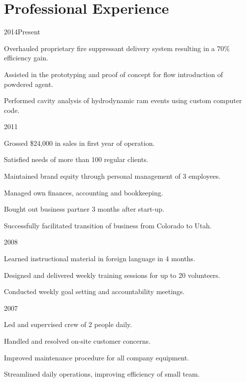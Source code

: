 \documentclass[letterpaper,10pt]{resume}
\begin{document}
	\section{Professional Experience}
	{2014\textendash Present}
	\begin{compactitem}
		\item Overhauled proprietary fire suppressant delivery system resulting in a 70\% efficiency gain.
		\item Assisted in the prototyping and proof of concept for flow introduction of powdered agent. 
		\item Performed cavity analysis of hydrodynamic ram events using custom computer code.
	\end{compactitem}
	
	{2011}
	\begin{compactitem}
		\item Grossed \$24,000 in sales in first year of operation.
		\item Satisfied needs of  more than 100 regular clients.
		\item Maintained brand equity through personal management of 3 employees.
		\item Managed own finances, accounting and bookkeeping.
		\item Bought out business partner 3 months after start-up.
		\item Successfully facilitated transition of business from Colorado to Utah.
	\end{compactitem}
	
	{2008}
	\begin{compactitem}
		\item Learned instructional material in foreign language in 4 months.
		\item Designed and delivered weekly training sessions for up to 20 volunteers.
		\item Conducted weekly goal setting and accountability meetings.
	\end{compactitem}
	
	{2007}
	\begin{compactitem}
		\item Led and supervised crew of 2 people daily.
		\item Handled and resolved on-site customer concerns.
		\item Improved maintenance procedure for all company equipment.
		\item Streamlined daily operations, improving efficiency of small team.
	\end{compactitem}
	
\end{document}
